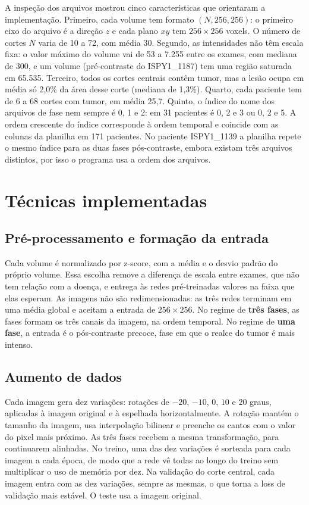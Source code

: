 \documentclass[12pt]{article}
\begin{document}
A inspeção dos arquivos mostrou cinco características que orientaram a implementação. Primeiro, cada
volume tem formato $(N, 256, 256)$: o primeiro eixo do arquivo é a direção $z$ e cada plano $xy$ tem
$256 \times 256$ voxels. O número de cortes $N$ varia de 10 a 72, com média 30. Segundo, as intensidades
não têm escala fixa: o valor máximo do volume vai de 53 a 7.255 entre os exames, com mediana de 300, e um
volume (pré-contraste do ISPY1\_1187) tem uma região saturada em 65.535. Terceiro, todos os
cortes centrais contêm tumor, mas a lesão ocupa em média só 2,0\% da área desse corte (mediana de 1,3\%).
Quarto, cada paciente tem de 6 a 68 cortes com tumor, em média 25,7. Quinto, o índice do nome dos arquivos
de fase nem sempre é 0, 1 e 2: em 31 pacientes é 0, 2 e 3 ou 0, 2 e 5. A ordem crescente do índice
corresponde à ordem temporal e coincide com as colunas da planilha em 171 pacientes. No paciente
ISPY1\_1139 a planilha repete o mesmo índice para as duas fases pós-contraste, embora existam três
arquivos distintos, por isso o programa usa a ordem dos arquivos.

\section{Técnicas implementadas}
\label{sec:tecnicas}

\subsection{Pré-processamento e formação da entrada}

Cada volume é normalizado por z-score, com a média e o desvio padrão do próprio volume. Essa escolha
remove a diferença de escala entre exames, que não tem relação com a doença, e entrega às redes
pré-treinadas valores na faixa que elas esperam. As imagens não são redimensionadas: as três redes terminam
em uma média global e aceitam a entrada de $256 \times 256$. No regime de \textbf{três fases}, as fases
formam os três canais da imagem, na ordem temporal. No regime de \textbf{uma fase}, a entrada é o
pós-contraste precoce, fase em que o realce do tumor é mais intenso.

\subsection{Aumento de dados}

Cada imagem gera dez variações: rotações de $-20$, $-10$, $0$, $10$ e $20$ graus, aplicadas à imagem
original e à espelhada horizontalmente. A rotação mantém o tamanho da imagem, usa interpolação bilinear e
preenche os cantos com o valor do pixel mais próximo. As três fases recebem a mesma transformação, para
continuarem alinhadas. No treino, uma das dez variações é sorteada para cada imagem a cada época, de modo
que a rede vê todas ao longo do treino sem multiplicar o uso de memória por dez. Na validação do corte
central, cada imagem entra com as dez variações, sempre as mesmas, o que torna a loss de validação mais
estável. O teste usa a imagem original.
\end{document}

